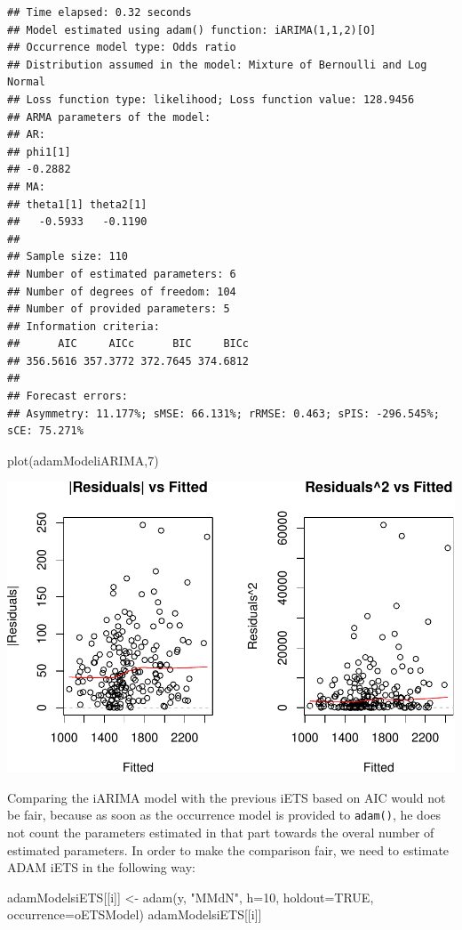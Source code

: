 \documentclass[
]{book}
\newenvironment{Shaded}{\begin{snugshade}}{\end{snugshade}}
\newcommand{\AttributeTok}[1]{\textcolor[rgb]{0.77,0.63,0.00}{#1}}
\newcommand{\ConstantTok}[1]{\textcolor[rgb]{0.00,0.00,0.00}{#1}}
\newcommand{\DecValTok}[1]{\textcolor[rgb]{0.00,0.00,0.81}{#1}}
\newcommand{\FunctionTok}[1]{\textcolor[rgb]{0.00,0.00,0.00}{#1}}
\newcommand{\NormalTok}[1]{#1}
\newcommand{\OtherTok}[1]{\textcolor[rgb]{0.56,0.35,0.01}{#1}}
\newcommand{\StringTok}[1]{\textcolor[rgb]{0.31,0.60,0.02}{#1}}
\theoremstyle{definition}
\theoremstyle{definition}
\theoremstyle{definition}
\theoremstyle{definition}
\theoremstyle{remark}
\begin{document}
\begin{verbatim}
## Time elapsed: 0.32 seconds
## Model estimated using adam() function: iARIMA(1,1,2)[O]
## Occurrence model type: Odds ratio
## Distribution assumed in the model: Mixture of Bernoulli and Log Normal
## Loss function type: likelihood; Loss function value: 128.9456
## ARMA parameters of the model:
## AR:
## phi1[1] 
## -0.2882 
## MA:
## theta1[1] theta2[1] 
##   -0.5933   -0.1190 
## 
## Sample size: 110
## Number of estimated parameters: 6
## Number of degrees of freedom: 104
## Number of provided parameters: 5
## Information criteria:
##      AIC     AICc      BIC     BICc 
## 356.5616 357.3772 372.7645 374.6812 
## 
## Forecast errors:
## Asymmetry: 11.177%; sMSE: 66.131%; rRMSE: 0.463; sPIS: -296.545%; sCE: 75.271%
\end{verbatim}

\begin{Shaded}
\begin{Highlighting}[]
\FunctionTok{plot}\NormalTok{(adamModeliARIMA,}\DecValTok{7}\NormalTok{)}
\end{Highlighting}
\end{Shaded}

\includegraphics{adam_files/figure-latex/unnamed-chunk-125-1.pdf}

Comparing the iARIMA model with the previous iETS based on AIC would not be fair, because as soon as the occurrence model is provided to \texttt{adam()}, he does not count the parameters estimated in that part towards the overal number of estimated parameters. In order to make the comparison fair, we need to estimate ADAM iETS in the following way:

\begin{Shaded}
\begin{Highlighting}[]
\NormalTok{adamModelsiETS[[i]] }\OtherTok{\textless{}{-}} \FunctionTok{adam}\NormalTok{(y, }\StringTok{"MMdN"}\NormalTok{, }\AttributeTok{h=}\DecValTok{10}\NormalTok{, }\AttributeTok{holdout=}\ConstantTok{TRUE}\NormalTok{,}
                            \AttributeTok{occurrence=}\NormalTok{oETSModel)}
\NormalTok{adamModelsiETS[[i]]}
\end{Highlighting}
\end{Shaded}
\end{document}
